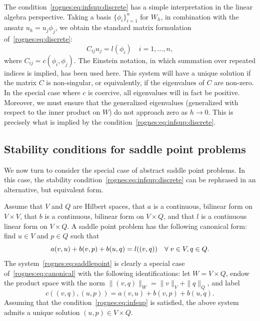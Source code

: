 The condition~\eqref{rognes:eq:infsup:discrete} has a simple
interpretation in the linear algebra perspective. Taking a basis
$\{\phi_i \}_{i=1}^n$ for $W_h$, in combination with the ansatz
$u_h = u_j \phi_j$, we obtain the standard matrix formulation
of~\eqref{rognes:eq:discrete}:
\begin{equation*}
  C_{ij} u_j = l(\phi_i) \quad i = 1, \dots, n,
\end{equation*}
where $C_{ij} = c(\phi_i, \phi_j)$. The Einstein notation, in which
summation over repeated indices is implied, has been used here. This
system will have a unique solution if the matrix $C$ is non-singular,
or equivalently, if the eigenvalues of $C$ are non-zero. In the
special case where $c$ is coercive, all eigenvalues will in fact be
positive. Moreover, we must ensure that the generalized eigenvalues
(generalized with respect to the inner product on $W$) do not approach
zero as $h \rightarrow 0$. This is precisely what is implied by the
condition~\eqref{rognes:eq:infsup:discrete}.

\subsection{Stability conditions for saddle point problems}

We now turn to consider the special case of abstract saddle point
problems. In this case, the stability
condition~\eqref{rognes:eq:infsup:discrete} can be rephrased in an
alternative, but equivalent form.

Assume that $V$ and $Q$ are Hilbert spaces, that $a$ is a continuous,
bilinear form on $V \times V$, that $b$ is a continuous, bilinear form
on $V \times Q$, and that $l$ is a continuous linear form on $V \times
Q$. A saddle point problem has the following canonical form: find $u
\in V$ and $p \in Q$ such that
\begin{equation}
    \label{rognes:eq:saddlepoint}
    a(v, u) + b(v, p) + b(u, q) = l((v, q))
    \quad \forall \; v \in V, q \in Q.
\end{equation}
The system~\eqref{rognes:eq:saddlepoint} is clearly a special case
of~\eqref{rognes:eq:canonical} with the following identifications: let
$W = V \times Q$, endow the product space with the norm $\|(v,
q)\|_{W} = \|v\|_{V} + \|q\|_{Q}$, and label
\begin{equation*}
  c((v, q), (u, p)) = a(v, u) + b(v, p) + b(u, q).
\end{equation*}
Assuming that the condition~\eqref{rognes:eq:infsup} is satisfied,
the above system admits a unique solution $(u, p) \in V \times Q$.

